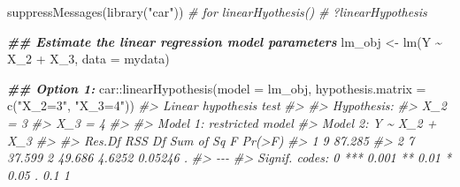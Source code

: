 \documentclass[
  14pt,
]{memoir}
\newenvironment{Shaded}{\begin{snugshade}}{\end{snugshade}}
\newcommand{\AttributeTok}[1]{\textcolor[rgb]{0.77,0.63,0.00}{#1}}
\newcommand{\CommentTok}[1]{\textcolor[rgb]{0.56,0.35,0.01}{\textit{#1}}}
\newcommand{\DocumentationTok}[1]{\textcolor[rgb]{0.56,0.35,0.01}{\textbf{\textit{#1}}}}
\newcommand{\FunctionTok}[1]{\textcolor[rgb]{0.00,0.00,0.00}{#1}}
\newcommand{\NormalTok}[1]{#1}
\newcommand{\OtherTok}[1]{\textcolor[rgb]{0.56,0.35,0.01}{#1}}
\newcommand{\SpecialCharTok}[1]{\textcolor[rgb]{0.00,0.00,0.00}{#1}}
\newcommand{\StringTok}[1]{\textcolor[rgb]{0.31,0.60,0.02}{#1}}
\begin{document}
\begin{Shaded}
\begin{Highlighting}[]
\FunctionTok{suppressMessages}\NormalTok{(}\FunctionTok{library}\NormalTok{(}\StringTok{"car"}\NormalTok{)) }\CommentTok{\# for linearHyothesis()}
\CommentTok{\# ?linearHypothesis}

\DocumentationTok{\#\# Estimate the linear regression model parameters}
\NormalTok{lm\_obj }\OtherTok{\textless{}{-}} \FunctionTok{lm}\NormalTok{(Y }\SpecialCharTok{\textasciitilde{}}\NormalTok{ X\_2 }\SpecialCharTok{+}\NormalTok{ X\_3, }\AttributeTok{data =}\NormalTok{ mydata)}

\DocumentationTok{\#\# Option 1:}
\NormalTok{car}\SpecialCharTok{::}\FunctionTok{linearHypothesis}\NormalTok{(}\AttributeTok{model =}\NormalTok{ lm\_obj, }
                      \AttributeTok{hypothesis.matrix =} \FunctionTok{c}\NormalTok{(}\StringTok{"X\_2=3"}\NormalTok{, }\StringTok{"X\_3=4"}\NormalTok{))}
\CommentTok{\#\textgreater{} Linear hypothesis test}
\CommentTok{\#\textgreater{} }
\CommentTok{\#\textgreater{} Hypothesis:}
\CommentTok{\#\textgreater{} X\_2 = 3}
\CommentTok{\#\textgreater{} X\_3 = 4}
\CommentTok{\#\textgreater{} }
\CommentTok{\#\textgreater{} Model 1: restricted model}
\CommentTok{\#\textgreater{} Model 2: Y \textasciitilde{} X\_2 + X\_3}
\CommentTok{\#\textgreater{} }
\CommentTok{\#\textgreater{}   Res.Df    RSS Df Sum of Sq      F  Pr(\textgreater{}F)  }
\CommentTok{\#\textgreater{} 1      9 87.285                              }
\CommentTok{\#\textgreater{} 2      7 37.599  2    49.686 4.6252 0.05246 .}
\CommentTok{\#\textgreater{} {-}{-}{-}}
\CommentTok{\#\textgreater{} Signif. codes:  0 \textquotesingle{}***\textquotesingle{} 0.001 \textquotesingle{}**\textquotesingle{} 0.01 \textquotesingle{}*\textquotesingle{} 0.05 \textquotesingle{}.\textquotesingle{} 0.1 \textquotesingle{} \textquotesingle{} 1}


\end{Highlighting}
\end{Shaded}
\end{document}
